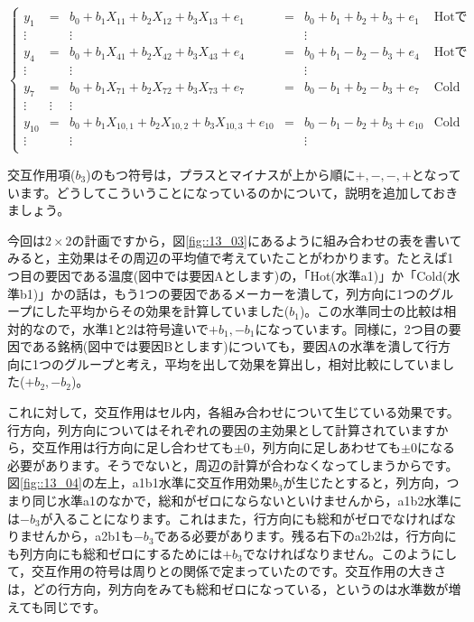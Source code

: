 \documentclass{ltjbook}
\begin{document}
\[
	\label{eq13_06}
	\left\{
	\begin{array}{cccccc}
		y_1    & =      & b_0 + b_1 X_{11} + b_2 X_{12} + b_3 X_{13}+ e_1          & = & b_0 + b_1 + b_2  + b_3 + e_1   & \mbox{Hotで銘柄A}  \\
		\vdots &        & \vdots                                                   &   & \vdots                                              \\
		y_4    & =      & b_0 + b_1 X_{41} + b_2 X_{42} + b_3 X_{43}+ e_4          & = & b_0 + b_1 - b_2 - b_3 + e_4    & \mbox{Hotで銘柄B}  \\
		\vdots &        & \vdots                                                   &   & \vdots                                              \\
		y_7    & =      & b_0 + b_1 X_{71} + b_2 X_{72} + b_3 X_{73}+ e_7          & = & b_0 - b_1 + b_2 - b_3 + e_7    & \mbox{Coldで銘柄A} \\
		\vdots & \vdots & \vdots                                                                                                             \\
		y_{10} & =      & b_0 + b_1 X_{10,1} + b_2 X_{10,2} + b_3 X_{10,3}+ e_{10} & = & b_0 - b_1 - b_2+ b_3  + e_{10} & \mbox{Coldで銘柄B} \\
		\vdots &        & \vdots                                                   &   & \vdots                         &                    \\
	\end{array}
	\right .
\]

交互作用項($b_3$)のもつ符号は，プラスとマイナスが上から順に$+,-,-,+$となっています。どうしてこういうことになっているのかについて，説明を追加しておきましょう。

今回は$2\times2$の計画ですから，図\ref{fig::13_03}にあるように組み合わせの表を書いてみると，主効果はその周辺の平均値で考えていたことがわかります。たとえば1つ目の要因である温度(図中では要因Aとします)の，「Hot(水準a1)」か「Cold(水準b1)」かの話は，もう1つの要因であるメーカーを潰して，列方向に1つのグループにした平均からその効果を計算していました($b_1$)。この水準同士の比較は相対的なので，水準1と2は符号違いで$+b_1,-b_1$になっています。同様に，2つ目の要因である銘柄(図中では要因Bとします)についても，要因Aの水準を潰して行方向に1つのグループと考え，平均を出して効果を算出し，相対比較にしていました($+b_2,-b_2$)。

これに対して，交互作用はセル内，各組み合わせについて生じている効果です。行方向，列方向についてはそれぞれの要因の主効果として計算されていますから，交互作用は行方向に足し合わせても$\pm 0$，列方向に足しあわせても$\pm 0$になる必要があります。そうでないと，周辺の計算が合わなくなってしまうからです。図\ref{fig::13_04}の左上，a1b1水準に交互作用効果$b_3$が生じたとすると，列方向，つまり同じ水準a1のなかで，総和がゼロにならないといけませんから，a1b2水準には$-b_3$が入ることになります。これはまた，行方向にも総和がゼロでなければなりませんから，a2b1も$-b_3$である必要があります。残る右下のa2b2は，行方向にも列方向にも総和ゼロにするためには$+b_3$でなければなりません。このようにして，交互作用の符号は周りとの関係で定まっていたのです。交互作用の大きさは，どの行方向，列方向をみても総和ゼロになっている，というのは水準数が増えても同じです。
\end{document}
